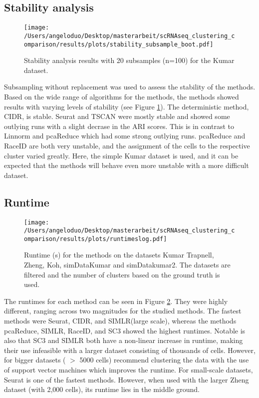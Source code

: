 \documentclass[12pt, a4paper]{article}\usepackage[]{graphicx}\usepackage[]{color}
\begin{document}
\subsection{Stability  analysis}
\begin{figure}[!h]
\texttt{[image: /Users/angeloduo/Desktop/masterarbeit/scRNAseq\_clustering\_comparison/results/plots/stability\_subsample\_boot.pdf]}
\caption{Stability analysis results with 20 subsamples (n=100) for the Kumar dataset.}
\label{fig:stab}
\end{figure}

Subsampling without replacement was used to assess the stability of the methods. Based on the wide range of algorithms for the methods, the methods showed results with varying levels of stability (see Figure \ref{fig:stab}). The deterministic method, CIDR, is stable. Seurat and TSCAN were mostly stable and showed some outlying runs with a slight decrase in the ARI scores. This is in contrast to Linnorm and pcaReduce which had some strong outlying runs. pcaReduce and RaceID are both very unstable, and the assignment of the cells to the respective cluster varied greatly. Here, the simple Kumar dataset is used, and it can be expected that the methods will behave even more unstable with a more difficult dataset. 
\newpage

\subsection{Runtime} 

\begin{figure}[htp]
\begin{center}
\texttt{[image: /Users/angeloduo/Desktop/masterarbeit/scRNAseq\_clustering\_comparison/results/plots/runtimeslog.pdf]}
\caption{Runtime (s) for the methods on the datasets Kumar Trapnell, Zheng, Koh, simDataKumar and simDatakumar2. The datasets are filtered and the number of clusters based on the ground truth is used.}
\label{fig:runtimelog}
\end{center}
\end{figure}

The runtimes for each method can be seen in Figure \ref{fig:runtimelog}. They were highly different, ranging across two magnitudes for the studied methods. The fastest methods were Seurat, CIDR, and SIMLR(large scale), whereas the methods pcaReduce, SIMLR, RaceID, and SC3 showed the highest runtimes. 
Notable is also that SC3 and SIMLR both have a non-linear increase in runtime, making their use infeasible with a larger dataset consisting of thousands of cells. However, for bigger datasets ( $>$ 5000 cells) \citet{} recommend clustering the data with the use of support vector machines which improves the runtime. 
For small-scale datasets, Seurat is one of the fastest methods. However, when used with the larger Zheng dataset (with 2,000 cells), its runtime lies in the middle ground.
\end{document}
